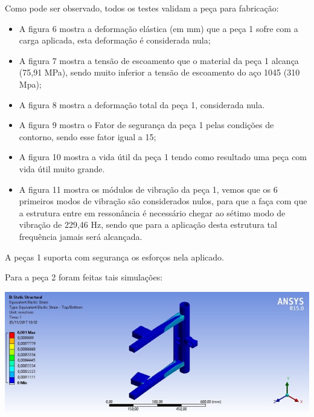     Como pode ser observado, todos os testes validam a peça para fabricação:
    \begin{itemize}
        \item A figura 6 mostra a deformação elástica (em mm) que a peça 1 sofre com a carga aplicada, esta deformação é considerada nula;
        \item A figura 7 mostra a tensão de escoamento que o material da peça 1 alcança (75,91 MPa), sendo muito inferior a tensão de escoamento do aço 1045 (310 Mpa);
        \item A figura 8 mostra a deformação total da peça 1, considerada nula.
        \item A figura 9 mostra o Fator de segurança da peça 1 pelas condições de contorno, sendo esse fator igual a 15;
        \item A figura 10 mostra a vida útil da peça 1 tendo como resultado uma peça com vida útil muito grande.
        \item A figura 11 mostra os módulos de vibração da peça 1, vemos que os 6 primeiros modos de vibração são considerados nulos, para que a faça com que a estrutura entre em ressonância é necessário chegar ao sétimo modo de vibração de 229,46 Hz, sendo que para a aplicação desta estrutura tal frequência jamais será alcançada.
    \end{itemize}
    
    A peças 1 suporta com segurança os esforços nela aplicado.
 
    Para a peça 2 foram feitas tais simulações:
 

    \begin{center}
    	\includegraphics[scale=0.7]{figuras/sim_estatica_4}
        \label{sim_estatica_4}
    \end{center}
    
